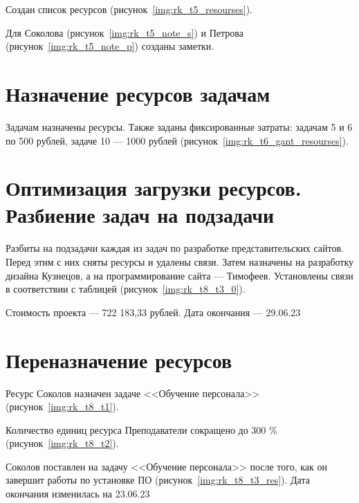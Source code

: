 Создан список ресурсов (рисунок~\ref{img:rk_t5_resourses}).

Для Соколова (рисунок~\ref{img:rk_t5_note_s}) и Петрова (рисунок~\ref{img:rk_t5_note_p}) созданы заметки.

\section{Назначение ресурсов задачам}

Задачам назначены ресурсы. Также заданы фиксированные затраты: задачам 5 и 6 по 500 рублей, задаче 10 --- 1000 рублей (рисунок~\ref{img:rk_t6_gant_resourses}).

\section{Оптимизация загрузки ресурсов. Разбиение задач на подзадачи}

Разбиты на подзадачи каждая из задач по разработке представительских сайтов. Перед этим с них сняты ресурсы и удалены связи. Затем назначены на разработку дизайна Кузнецов, а на программирование сайта --- Тимофеев. Установлены связи в соответствии с таблицей (рисунок~\ref{img:rk_t8_t3_0}).

Стоимость проекта --- 722 183,33 рублей. Дата окончания --- 29.06.23

\newpage
\section{Переназначение ресурсов}

Ресурс Соколов назначен задаче <<Обучение персонала>> (рисунок~\ref{img:rk_t8_t1}).

Количество единиц ресурса Преподаватели сокращено до 300 \% (рисунок~\ref{img:rk_t8_t2}).

Соколов поставлен на задачу <<Обучение персонала>> после того, как он завершит работы по установке ПО (рисунок~\ref{img:rk_t8_t3_res}). Дата окончания изменилась на 23.06.23

